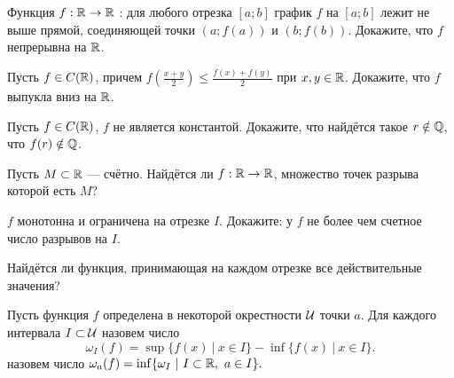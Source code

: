 \documentclass[a4paper,12pt]{article}
\begin{document}

 Функция $f:\mathbb{R}\rightarrow\mathbb{R}$ :
для любого отрезка $[a;b]$ график $f$ на $[a;b]$ лежит не выше прямой,
соединяющей  точки $(a;f(a))$ и $(b;f(b))$.
Докажите, что $f$ непрерывна на $\mathbb{R}$.

Пусть $f\in C(\mathbb{R})$, причем $f(\frac{x+y}2) \leq \frac{f(x)+f(y)}2$ при $x,y\in\mathbb{R}$. Докажите, что $f$ выпукла вниз на $\mathbb{R}$.

Пусть $f\in C(\mathbb{R})$, $f$ не является константой.
Докажите, что найд\"ется такое $r\notin\mathbb{Q}$, что $f(r)\notin\mathbb{Q}$.



Пусть $M\subset\mathbb{R}$ --- сч\"етно. Найд\"ется ли %
$f:\mathbb{R}\rightarrow\mathbb{R}$,
множество точек разрыва которой есть $M$?

$f$ монотонна и ограничена на отрезке $I$. Докажите: %
у $f$ не более чем счетное число разрывов на $I$.

Найдётся ли функция, принимающая
на каждом отрезке все действительные значения?



Пусть функция $f$ определена в некоторой окрестности $\cal U$ точки $a$. Для каждого интервала $I\subset\cal U$ назовем  число
$$\omega_I(f)=\sup\{f(x)\ |\ x\in I\}-\inf\{f(x)\ |\ x\in I\}.$$
 назовем число
$\omega_a(f)=\inf\{\omega_I\ |\ I\subset\R,\ a\in I\}.$
\end{document}
